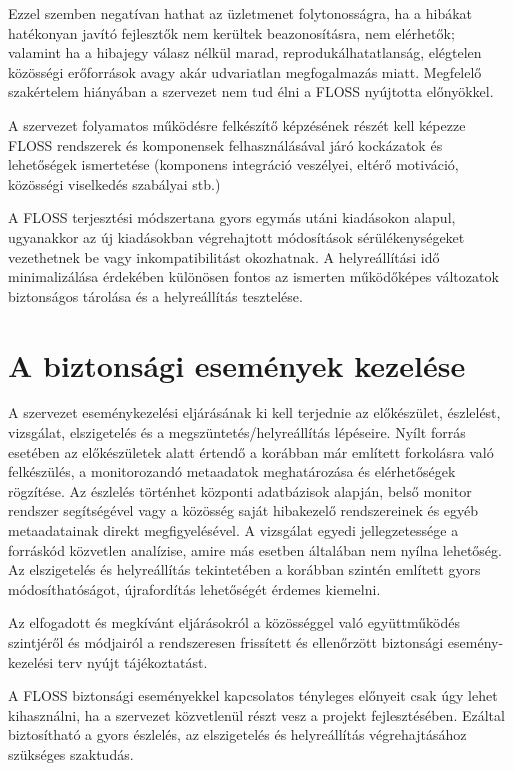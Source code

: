 \documentclass[12pt,magyar,a4paper,oneside]{scrreprt}
\begin{document}
Ezzel szemben negatívan hathat az üzletmenet folytonosságra, ha a
hibákat hatékonyan javító fejlesztők nem kerültek beazonosításra, nem
elérhetők; valamint ha a hibajegy válasz nélkül marad,
reprodukálhatatlanság, elégtelen közösségi erőforrások avagy akár
udvariatlan megfogalmazás miatt. Megfelelő szakértelem hiányában a
szervezet nem tud élni a FLOSS nyújtotta előnyökkel.

A szervezet folyamatos működésre felkészítő képzésének részét kell
képezze FLOSS rendszerek és komponensek felhasználásával járó kockázatok
és lehetőségek ismertetése (komponens integráció veszélyei, eltérő
motiváció, közösségi viselkedés szabályai stb.)

A FLOSS terjesztési módszertana gyors egymás utáni kiadásokon alapul,
ugyanakkor az új kiadásokban végrehajtott módosítások sérülékenységeket
vezethetnek be vagy inkompatibilitást okozhatnak. A helyreállítási idő
minimalizálása érdekében különösen fontos az ismerten működőképes
változatok biztonságos tárolása és a helyreállítás tesztelése.

\hypertarget{a-biztonsuxe1gi-esemuxe9nyek-kezeluxe9se}{%
\section{A biztonsági események
kezelése}\label{a-biztonsuxe1gi-esemuxe9nyek-kezeluxe9se}}

A szervezet eseménykezelési eljárásának ki kell terjednie az
előkészület, észlelést, vizsgálat, elszigetelés és a
megszüntetés/helyreállítás lépéseire. Nyílt forrás esetében az
előkészületek alatt értendő a korábban már említett forkolásra való
felkészülés, a monitorozandó metaadatok meghatározása és elérhetőségek
rögzítése. Az észlelés történhet központi adatbázisok alapján, belső
monitor rendszer segítségével vagy a közösség saját hibakezelő
rendszereinek és egyéb metaadatainak direkt megfigyelésével. A vizsgálat
egyedi jellegzetessége a forráskód közvetlen analízise, amire más
esetben általában nem nyílna lehetőség. Az elszigetelés és helyreállítás
tekintetében a korábban szintén említett gyors módosíthatóságot,
újrafordítás lehetőségét érdemes kiemelni.

Az elfogadott és megkívánt eljárásokról a közösséggel való együttműködés
szintjéről és módjairól a rendszeresen frissített és ellenőrzött
biztonsági esemény-kezelési terv nyújt tájékoztatást.

A FLOSS biztonsági eseményekkel kapcsolatos tényleges előnyeit csak úgy
lehet kihasználni, ha a szervezet közvetlenül részt vesz a projekt
fejlesztésében. Ezáltal biztosítható a gyors észlelés, az elszigetelés
és helyreállítás végrehajtásához szükséges szaktudás.
\end{document}
